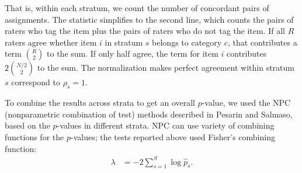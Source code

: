 \documentclass[]{article}
\begin{document}
That is, within each stratum, we count the number of concordant pairs of
assignments.
The statistic simplifies to the second line, which counts the pairs of raters who tag the item plus the pairs of raters who do not tag the item.
If all $R$ raters agree whether item $i$ in stratum $s$ belongs to category
$c$, that contributes a term ${R \choose 2}$ to the sum.
If only half agree, the term for item $i$ contributes $2 {N/2 \choose 2}$ to
the sum.
The normalization makes perfect agreement within stratum $s$ correspond to
$\rho_s = 1$.

To combine the results across strata to get an overall $p$-value, we 
used the NPC (nonparametric
combination of test) methods described in Pesarin and Salmaso, based on
the $p$-values in different strata.
NPC can use  variety of combining functions for the $p$-values;
the tests reported above used Fisher's combining function:
\begin{align*}
    \lambda &= - 2\sum_{s=1}^S  \log \hat{p}_s.
\end{align*}
\end{document}
